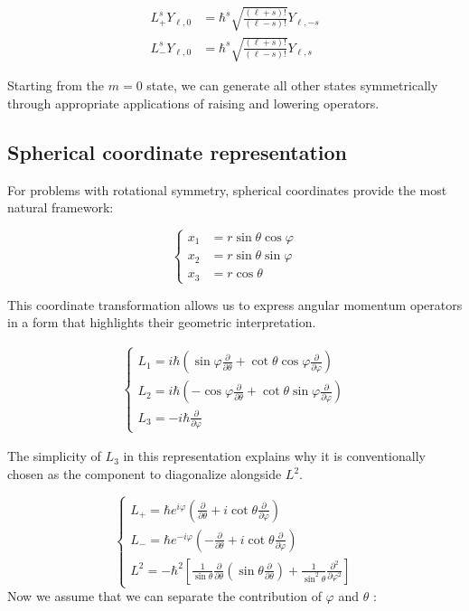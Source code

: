 \documentclass[italian]{HKNdocument}
\begin{document}
\begin{align}
L_{+}^{s} Y_{\ell, 0} & =\hbar^{s} \sqrt{\frac{(\ell+s)!}{(\ell-s)!}} Y_{\ell,-s} \\
L_{-}^{s} Y_{\ell, 0} & =\hbar^{s} \sqrt{\frac{(\ell+s)!}{(\ell-s)!}} Y_{\ell, s} \label{eq:8.28}
\end{align}

Starting from the $m=0$ state, we can generate all other states symmetrically through appropriate applications of raising and lowering operators.

\subsection{Spherical coordinate representation}
For problems with rotational symmetry, spherical coordinates provide the most natural framework:

\[
\begin{cases}x_{1} & =r \sin \theta \cos \varphi  \label{eq:8.29}\\ x_{2} & =r \sin \theta \sin \varphi \\ x_{3} & =r \cos \theta\end{cases}
\]

This coordinate transformation allows us to express angular momentum operators in a form that highlights their geometric interpretation.

\begin{align}
\left\{\begin{array}{l}
L_{1} = i \hbar\left(\sin \varphi \frac{\partial}{\partial \theta}+\cot \theta \cos \varphi \frac{\partial}{\partial \varphi}\right)  \label{eq:8.30}\\
L_{2} = i \hbar\left(-\cos \varphi \frac{\partial}{\partial \theta}+\cot \theta \sin \varphi \frac{\partial}{\partial \varphi}\right) \\
L_{3} = -i \hbar \frac{\partial}{\partial \varphi}
\end{array}\right.
\end{align}

The simplicity of $L_3$ in this representation explains why it is conventionally chosen as the component to diagonalize alongside $L^2$.

\[
\left\{\begin{array}{l}
L_{+}=\hbar e^{i \varphi}\left(\frac{\partial}{\partial \theta}+i \cot \theta \frac{\partial}{\partial \varphi}\right)  \label{eq:8.31}\\
L_{-}=\hbar e^{-i \varphi}\left(-\frac{\partial}{\partial \theta}+i \cot \theta \frac{\partial}{\partial \varphi}\right) \\
L^{2}=-\hbar^{2}\left[\frac{1}{\sin \theta} \frac{\partial}{\partial \theta}\left(\sin \theta \frac{\partial}{\partial \theta}\right)+\frac{1}{\sin ^{2} \theta} \frac{\partial^{2}}{\partial \varphi^{2}}\right]
\end{array}\right.
\]
Now we assume that we can separate the contribution of $\varphi$ and $\theta$ :
\end{document}
